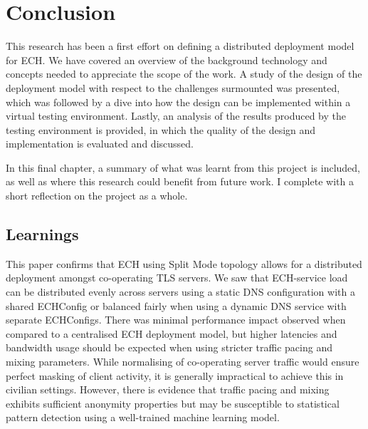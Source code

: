 \chapter{Conclusion}\label{Conclusion}

This research has been a first effort on defining a distributed deployment model for ECH. We have covered an overview of the background technology and concepts needed to appreciate the scope of the work. A study of the design of the deployment model with respect to the challenges surmounted was presented, which was followed by a dive into how the design can be implemented within a virtual testing environment. Lastly, an analysis of the results produced by the testing environment is provided, in which the quality of the design and implementation is evaluated and discussed.

In this final chapter, a summary of what was learnt from this project is included, as well as where this research could benefit from future work. I complete with a short reflection on the project as a whole.









\section{Learnings}

This paper confirms that ECH using Split Mode topology allows for a distributed deployment amongst co-operating TLS servers. We saw that ECH-service load can be distributed evenly across servers using a static DNS configuration with a shared ECHConfig or balanced fairly when using a dynamic DNS service with separate ECHConfigs. There was minimal performance impact observed when compared to a centralised ECH deployment model, but higher latencies and bandwidth usage should be expected when using stricter traffic pacing and mixing parameters. While normalising of co-operating server traffic would ensure perfect masking of client activity, it is generally impractical to achieve this in civilian settings. However, there is evidence that traffic pacing and mixing exhibits sufficient anonymity properties but may be susceptible to statistical pattern detection using a well-trained machine learning model.









